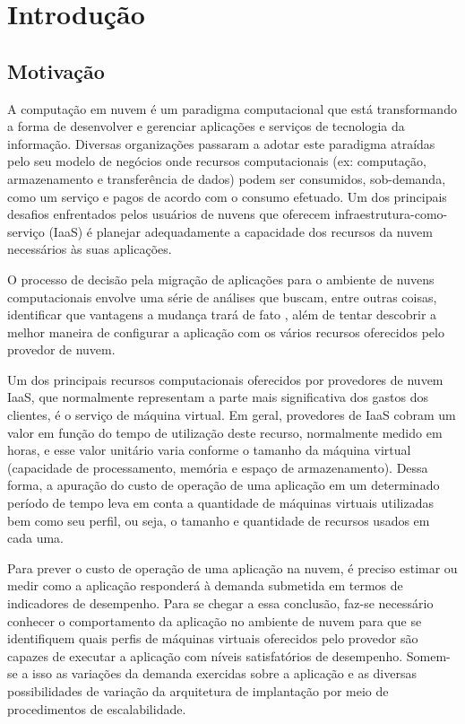 \chapter[Introdução]{Introdução}

\section{Motivação}

A computação em nuvem é um paradigma computacional que está
transformando a forma de desenvolver e gerenciar aplicações e serviços de
tecnologia da informação. Diversas organizações passaram a adotar este paradigma
atraídas pelo seu modelo de negócios onde recursos computacionais (ex:
computação, armazenamento e transferência de dados) podem ser consumidos, sob-demanda, 
como um serviço e pagos de acordo com o consumo efetuado. Um dos principais
desafios enfrentados pelos usuários de nuvens que oferecem 
infraestrutura-como-serviço (IaaS) é planejar adequadamente a capacidade 
dos recursos da nuvem necessários às suas aplicações.  

O processo de decisão pela migração de aplicações para o ambiente de nuvens computacionais 
envolve uma série de análises que buscam, entre outras coisas, identificar que vantagens a 
mudança trará de fato \cite{li2011cloudprophet, rodero2010infrastructure}, 
além de tentar descobrir a melhor maneira de configurar a aplicação com os
vários recursos oferecidos pelo provedor de nuvem.

Um dos principais recursos computacionais oferecidos por provedores de nuvem
IaaS, que normalmente representam a parte mais significativa dos gastos dos
clientes, é o serviço de máquina virtual. Em geral, provedores de IaaS cobram um
valor em função do tempo de utilização deste recurso, normalmente medido em horas, e esse valor 
unitário varia conforme o tamanho da máquina virtual (capacidade de processamento, memória e espaço de armazenamento).
Dessa forma, a apuração do custo de operação de uma aplicação em um determinado
período de tempo leva em conta a quantidade de máquinas virtuais utilizadas bem como seu perfil, ou seja, o tamanho e quantidade de recursos 
usados em cada uma.
 
Para prever o custo de operação de uma aplicação na nuvem, é preciso estimar ou medir como a 
aplicação responderá à demanda submetida em termos de indicadores de desempenho. Para se chegar a essa 
conclusão, faz-se necessário conhecer o comportamento 
da aplicação no ambiente de nuvem para que se identifiquem quais perfis de
máquinas virtuais oferecidos pelo provedor são capazes de executar a aplicação com níveis satisfatórios de desempenho. 
Somem-se a isso as variações da demanda exercidas sobre a aplicação e as
diversas possibilidades de variação da arquitetura de implantação por meio de
procedimentos de escalabilidade.
 
